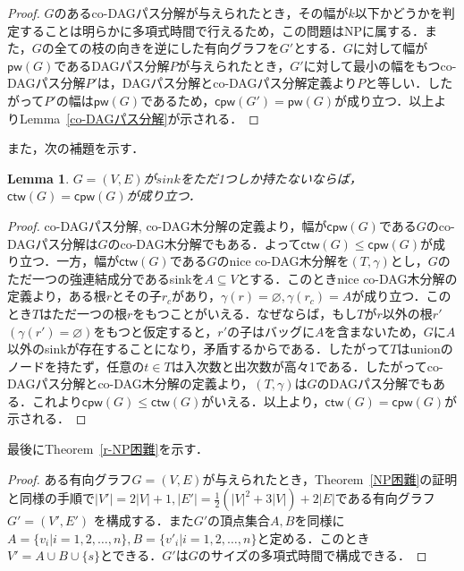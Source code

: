 \documentclass[master]{kuisthesis}		%
\theoremstyle{plain}
\newtheorem{lemma}{Lemma}
\theoremstyle{definition}
\begin{document}
{\begin{proof}
    $G$のあるco-DAGパス分解が与えられたとき，その幅が$k$以下かどうかを判定することは明らかに多項式時間で行えるため，この問題はNPに属する．また，$G$の全ての枝の向きを逆にした有向グラフを$G'$とする．$G$に対して幅が$\mathsf{pw}(G)$であるDAGパス分解$P$が与えられたとき，$G'$に対して最小の幅をもつco-DAGパス分解$P'$は，DAGパス分解とco-DAGパス分解定義より$P$と等しい．したがって$P'$の幅は$\mathsf{pw}(G)$であるため，$\mathsf{cpw}(G')= \mathsf{pw}(G)$が成り立つ．以上よりLemma~\ref{co-DAGパス分解}が示される．
\end{proof}





また，次の補題を示す．

\begin{lemma}\label{r-sink}
    $G =(V, E)$が$sink$をただ1つしか持たないならば，$\mathsf{ctw}(G) = \mathsf{cpw}(G)$が成り立つ．
\end{lemma}

\begin{proof}
    co-DAGパス分解, co-DAG木分解の定義より，幅が$\mathsf{cpw}(G)$である$G$のco-DAGパス分解は$G$のco-DAG木分解でもある．よって$\mathsf{ctw}(G) \leq \mathsf{cpw}(G)$が成り立つ．一方，幅が$\mathsf{ctw}(G)$である$G$のnice co-DAG木分解を$(T, \gamma)$とし，$G$のただ一つの強連結成分であるsinkを$A \subseteq V$とする．このときnice co-DAG木分解の定義より，ある根$r$とその子$r_c$があり，$\gamma(r) = \varnothing, \gamma(r_c) = A$が成り立つ．このとき$T$はただ一つの根$r$をもつことがいえる．なぜならば，もし$T$が$r$以外の根$r'$ $(\gamma(r') = \varnothing)$をもつと仮定すると，$r'$の子はバッグに$A$を含まないため，$G$に$A$以外のsinkが存在することになり，矛盾するからである．したがって$T$はunionのノードを持たず，任意の$t \in T$は入次数と出次数が高々1である．したがってco-DAGパス分解とco-DAG木分解の定義より，$(T, \gamma)$は$G$のDAGパス分解でもある．これより$\mathsf{cpw}(G) \leq \mathsf{ctw}(G)$がいえる．以上より，$\mathsf{ctw}(G) = \mathsf{cpw}(G)$が示される．
\end{proof}





最後にTheorem~\ref{r-NP困難}を示す．

\begin{proof}
    ある有向グラフ$G = (V, E)$が与えられたとき，Theorem~\ref{NP困難}の証明と同様の手順で$|V'| = 2|V| + 1, |E'| = \frac{1}{2}(|V|^2 + 3|V|) + 2|E|$である有向グラフ$G' = (V', E')$ を構成する．また$G'$の頂点集合$A, B$を同様に$A = \{v_i | i =1, 2, \dots, n\}, B = \{v'_i | i =1, 2, \dots, n\}$と定める．このとき$V' = A \cup B \cup \{s\}$とできる．$G'$は$G$のサイズの多項式時間で構成できる．
    

\end{proof}}
\end{document}
